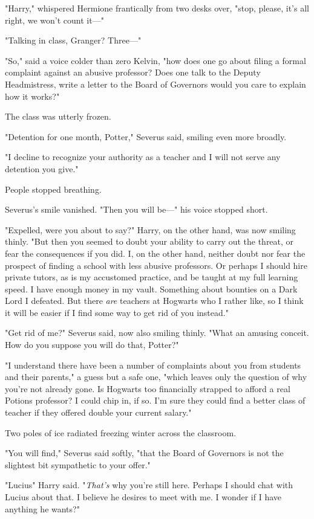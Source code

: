 "Harry," whispered Hermione frantically from two desks over, "stop, please,
it's all right, we won't count it\mbox{---}"

"Talking in class, Granger? Three\mbox{---}"

"So," said a voice colder than zero Kelvin, "how does one go about filing a
formal complaint against an abusive professor? Does one talk to the Deputy
Headmistress, write a letter to the Board of Governors{\el} would you care
to explain how it works?"

The class was utterly frozen.

"Detention for one month, Potter," Severus said, smiling even more broadly.

"I decline to recognize your authority as a teacher and I will not serve any
detention you give."

People stopped breathing.

Severus's smile vanished. "Then you will be\mbox{---}" his voice stopped short.

"Expelled, were you about to say?" Harry, on the other hand, was now smiling
thinly. "But then you seemed to doubt your ability to carry out the threat, or
fear the consequences if you did. I, on the other hand, neither doubt nor fear
the prospect of finding a school with less abusive professors. Or perhaps I
should hire private tutors, as is my accustomed practice, and be taught at my
full learning speed. I have enough money in my vault. Something about bounties
on a Dark Lord I defeated. But there \emph{are} teachers at Hogwarts who I
rather like, so I think it will be easier if I find some way to get rid of you
instead."

"Get rid of me?" Severus said, now also smiling thinly. "What an amusing
conceit. How do you suppose you will do that, Potter?"

"I understand there have been a number of complaints about you from students
and their parents," a guess but a safe one, "which leaves only the question of
why you're not already gone. Is Hogwarts too financially strapped to afford a
real Potions professor? I could chip in, if so. I'm sure they could find a
better class of teacher if they offered double your current salary."

Two poles of ice radiated freezing winter across the classroom.

"You will find," Severus said softly, "that the Board of Governors is not the
slightest bit sympathetic to your offer."

"Lucius{\el}" Harry said. "\emph{That's} why you're still here. Perhaps I
should chat with Lucius about that. I believe he desires to meet with me. I
wonder if I have anything he wants?"

